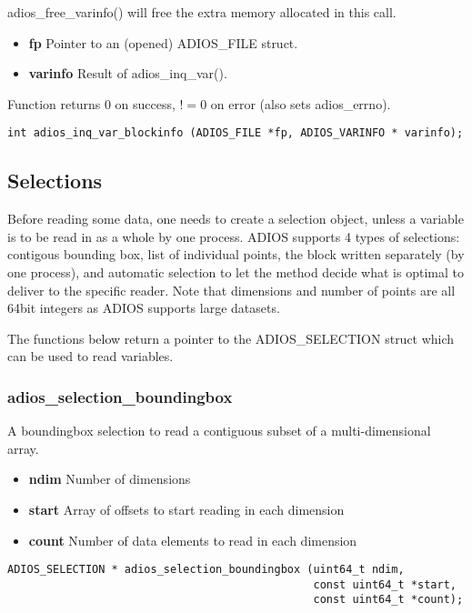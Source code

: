 adios\_free\_varinfo() will free the extra memory allocated in this call.
\begin{itemize} 
\item{\bf fp}       Pointer to an (opened) ADIOS\_FILE struct.
\item{\bf varinfo}  Result of adios\_inq\_var(). 
\end{itemize}
Function returns 0 on success, $!=0$ on error (also sets adios\_errno).

\begin{lstlisting}[alsolanguage=C]
int adios_inq_var_blockinfo (ADIOS_FILE *fp, ADIOS_VARINFO * varinfo);
\end{lstlisting}


%
%
\subsection{Selections}
Before reading some data, one needs to create a selection object, unless a variable is to be read in 
as a whole by one process. ADIOS supports 4 types of selections: contigous bounding box, list of 
individual points, the block written separately (by one process), and automatic selection to let the 
method decide what is optimal to deliver to the specific reader. Note that dimensions and number 
of points are all 64bit integers as ADIOS supports large datasets. 

The functions below return a pointer to the ADIOS\_SELECTION struct which can be used to read variables.
 

\subsubsection{adios\_selection\_boundingbox}
A boundingbox selection to read a contiguous subset of a multi-dimensional array.

\begin{itemize} 
\item{\bf ndim}      Number of dimensions
\item{\bf start}     Array of offsets to start reading in each dimension
\item{\bf count}     Number of data elements to read in each dimension
\end{itemize}

\begin{lstlisting}[alsolanguage=C]
ADIOS_SELECTION * adios_selection_boundingbox (uint64_t ndim, 
                                               const uint64_t *start, 
                                               const uint64_t *count);
\end{lstlisting}


